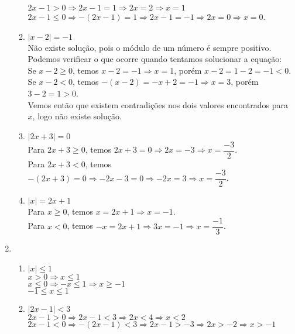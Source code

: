 \documentclass[10pt]{book}
\begin{document}
\begin{enumerate}
\begin{enumerate}
		$2x - 1 > 0 \Rightarrow 2x - 1 = 1 \Rightarrow 2x = 2 \Rightarrow x = 1$\\
		$2x - 1 \leq 0 \Rightarrow -(2x - 1) = 1 \Rightarrow 2x - 1 = -1 \Rightarrow 2x = 0 \Rightarrow x = 0$.	
		\item %
		$\vert x - 2 \vert = -1$\\
		Não existe solução, pois o módulo de um número é sempre positivo.\\
		Podemos verificar o que ocorre quando tentamos solucionar a equação:\\
		Se $ x - 2 \geq 0$, temos $x - 2 = -1 \Rightarrow x = 1$, porém $x - 2 = 1 - 2 = -1 <  0$.\\
		Se $ x - 2  < 0$, temos $-(x - 2) = -x + 2 = -1 \Rightarrow x = 3$, porém $3 - 2 = 1 > 0$.\\
		Vemos então que existem contradições nos dois valores encontrados para $x$, logo não existe solução.
		\item %
		$\vert2x + 3 \vert = 0$\\
		Para $2x + 3 \geq 0$, temos $2x + 3 = 0 \Rightarrow 2x = -3 \Rightarrow x = \dfrac{-3}{2}$.\\
		Para $2x + 3 < 0$, temos $-(2x + 3) = 0 \Rightarrow -2x - 3 = 0\Rightarrow -2x = 3 \Rightarrow x = \dfrac{-3}{2}$.
		\item %
		$\vert x \vert = 2x + 1$\\
		Para $x \geq 0$, temos $x = 2x + 1 \Rightarrow x =-1$.\\
		Para $x < 0$, temos $-x = 2x + 1 \Rightarrow 3x = -1 \Rightarrow x = \dfrac{-1}{3}$.
	\end{enumerate}
	\item %
	\begin{enumerate}
		\setcounter{enumii}{0}
		\item %
		$\vert x \vert \leq 1$\\
		$ x > 0 \Rightarrow x \leq 1$\\
		$ x \leq 0 \Rightarrow -x \leq 1 \Rightarrow x \geq -1$\\
		$-1 \leq x \leq 1$
		\item %
		$\vert 2x - 1 \vert < 3$\\		
		$2x - 1 > 0 \Rightarrow 2x - 1 < 3 \Rightarrow 2x < 4 \Rightarrow x < 2$\\
		$2x - 1 < 0 \Rightarrow -(2x - 1) < 3 \Rightarrow 2x - 1 > -3  \Rightarrow 2x > -2 \Rightarrow x > -1$\\

\end{enumerate}
\end{enumerate}
\end{document}
